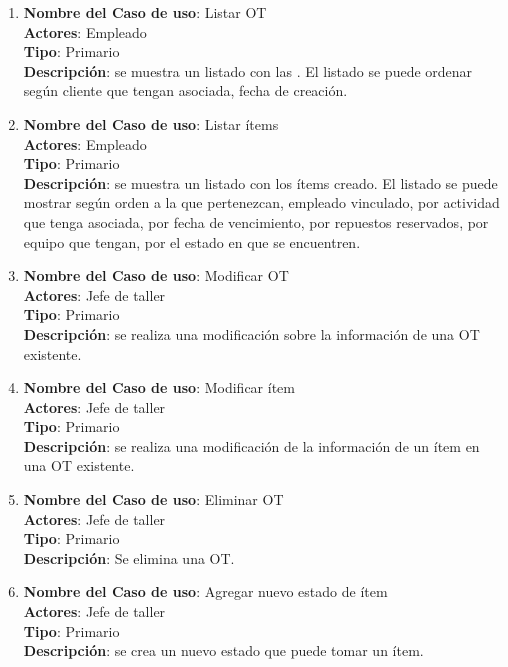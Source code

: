 \documentclass[12pt]{extarticle}
\begin{document}
\begin{spacing}{1.2}
\begin{enumerate}
        \item 	\textbf{Nombre del Caso de uso}: Listar OT\\
                \textbf{Actores}: Empleado\\
                \textbf{Tipo}: Primario\\
                \textbf{Descripción}: se muestra un listado con las \OTs{}. El listado se puede ordenar según cliente que tengan asociada, fecha de creación.

        \item 	\textbf{Nombre del Caso de uso}: Listar ítems\\
                \textbf{Actores}: Empleado\\
                \textbf{Tipo}: Primario\\
                \textbf{Descripción}: se muestra un listado con los ítems creado. El listado se puede mostrar según orden a la que pertenezcan, empleado vinculado, por actividad que tenga asociada, por fecha de vencimiento, por repuestos reservados, por equipo que tengan, por el estado en que se encuentren.

        \item 	\textbf{Nombre del Caso de uso}: Modificar OT\\
                \textbf{Actores}: Jefe de taller\\
                \textbf{Tipo}: Primario\\
                \textbf{Descripción}: se realiza una modificación sobre la información de una OT existente.

        \item 	\textbf{Nombre del Caso de uso}: Modificar ítem\\
                \textbf{Actores}: Jefe de taller\\
                \textbf{Tipo}: Primario\\
                \textbf{Descripción}: se realiza una modificación de la información de un ítem en una OT existente. 

        \item 	\textbf{Nombre del Caso de uso}: Eliminar OT\\
                \textbf{Actores}: Jefe de taller\\
                \textbf{Tipo}: Primario\\
                \textbf{Descripción}: Se elimina una OT.

        \item 	\textbf{Nombre del Caso de uso}: Agregar nuevo estado de ítem\\
                \textbf{Actores}: Jefe de taller\\
                \textbf{Tipo}: Primario\\
                \textbf{Descripción}: se crea un nuevo estado que puede tomar un ítem.


\end{enumerate}
\end{spacing}
\end{document}
